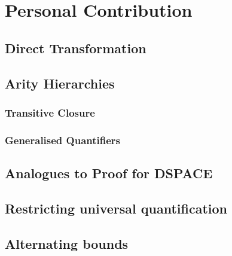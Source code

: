 \chapter{Personal Contribution}\label{ch:personal-contribution}

\section{Direct Transformation}

\section{Arity Hierarchies}

\subsection{Transitive Closure}

\subsection{Generalised Quantifiers}

\section{Analogues to Proof for DSPACE}

\section{Restricting universal quantification}

\section{Alternating bounds}